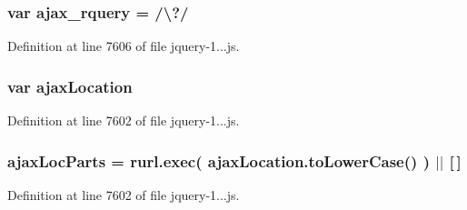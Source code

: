 \subsubsection[{ajax\+\_\+rquery}]{\setlength{\rightskip}{0pt plus 5cm}var ajax\+\_\+rquery = /\textbackslash{}?/}\label{obj_2_release_2_package_2_package_tmp_2_scripts_2jquery-1_810_82_8js_a4da85c0011217bf1643139dc23999c5c}


Definition at line 7606 of file jquery-\/1...\+js.

\hypertarget{obj_2_release_2_package_2_package_tmp_2_scripts_2jquery-1_810_82_8js_a1661d4e1676e7c6ffde5a3cb8d8ae246}{}
\subsubsection[{ajax\+Location}]{\setlength{\rightskip}{0pt plus 5cm}var ajax\+Location}\label{obj_2_release_2_package_2_package_tmp_2_scripts_2jquery-1_810_82_8js_a1661d4e1676e7c6ffde5a3cb8d8ae246}


Definition at line 7602 of file jquery-\/1...\+js.

\hypertarget{obj_2_release_2_package_2_package_tmp_2_scripts_2jquery-1_810_82_8js_a4c35110da3c335cfca38505ee65a5e79}{}
\subsubsection[{ajax\+Loc\+Parts}]{\setlength{\rightskip}{0pt plus 5cm}ajax\+Loc\+Parts = rurl.\+exec( ajax\+Location.\+to\+Lower\+Case() ) $\vert$$\vert$ \mbox{[}$\,$\mbox{]}}\label{obj_2_release_2_package_2_package_tmp_2_scripts_2jquery-1_810_82_8js_a4c35110da3c335cfca38505ee65a5e79}


Definition at line 7602 of file jquery-\/1...\+js.


